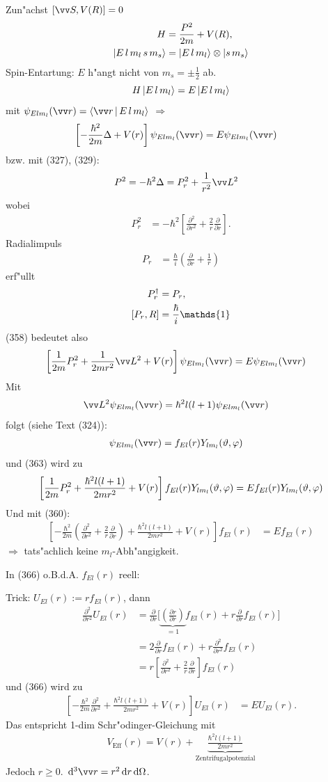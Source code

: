 \documentclass[a4paper]{scrartcl}
\newcommand{\dOne}{\ensuremath \mathds{1}}
\newcommand{\dd}{\ensuremath \, \mathrm{d}}
\renewcommand{\phi}{\ensuremath \varphi}
\newcommand{\eqn}[1]{\begin{align} #1 \end{align}}
\newcommand{\eqnnon}[1]{\begin{align*} #1 \end{align*}}
\newcommand{\spl}[1]{\begin{split} #1 \end{split}}
\begin{document}
{Zun"achst $[\vv S, V(R)] = 0$
\eqn{ \spl{ H & = \frac{P^2}{2m} + V(R), \\ \Ket{ E \, l \, m_l \, s \, m_s } & = \Ket{ E \, l \, m_l } \otimes \Ket{ s \, m_s}}}
Spin-Entartung: $E$ h"angt nicht von $m_s = \pm \frac12$ ab.
$$H \Ket{E \, l \, m_l } = E \Ket{ E \, l \, m_l }$$
mit $\psi_{E l m_l}(\vv r) = \Braket{ \vv r | E \, l \, m_l }$
$\Longrightarrow$
\eqn{ \left[ - \frac{\hbar^2}{2m} \Delta + V(r) \right] \psi_{E l m_l}(\vv r) & = E \psi_{E l m_l}(\vv r)}
bzw. mit (327), (329):
\eqn{ P^2 = - \hbar^2 \Delta & = P_r^2 + \frac1{r^2} \vv L^2}
wobei
\eqn{P_r^2 & = -\hbar^2 \left[ \frac {\partial^2}{\partial r^2} + \frac2r \frac \partial {\partial r} \right]. }
Radialimpuls
\eqn{ P_r & = \frac \hbar i \left( \frac \partial {\partial r} + \frac1r \right) }
erf"ullt
\eqn{ \spl{ P_r^\dagger & = P_r, \\ \left[ P_r, R \right] & = \frac \hbar i \dOne }}
(358) bedeutet also
\eqn{ \left[ \frac1{2m} P_r^2 + \frac1{2mr^2} \vv L^2 + V(r) \right] \psi_{E l m_l }(\vv r) & = E \psi_{E l m_l }(\vv r)}
Mit 
\eqn{ \vv L^2 \psi_{E l m_l} (\vv r) & = \hbar^2 l (l+1) \psi_{E l m_l}(\vv r)}
folgt (siehe Text (324)):
\eqn{\psi_{E l m_l}(\vv r) & = f_{E l}(r) Y_{l m_l}( \vartheta, \phi) }
und (363) wird zu 
$$\left[ \frac 1{2m} P_r^2 + \frac{\hbar^2 l (l+1)}{2 m r^2} + V(r) \right] f_{E l} (r) Y_{l m_l} ( \vartheta, \phi)  = E f_{El}(r) Y_{l m_l}(\vartheta, \phi)$$
Und mit (360):
\eqn{\left[ - \frac{\hbar^2}{2m} \left( \frac{\partial^2}{\partial r^2} + \frac 2 r \frac \partial {\partial r} \right) + \frac{ \hbar^2 l (l+1) }{2 m r^2} + V(r) \right] f_{E l}(r) & = E f_{E l}(r)}
$\Longrightarrow$ tats"achlich keine $m_l$-Abh"angigkeit.

In (366) o.B.d.A. $f_{E l }(r)$ reell:

Trick: $U_{E l}(r) := r f_{E l}(r)$, dann
\eqnnon{
\frac{\partial^2}{\partial r^2} U_{E l}(r) & = \frac{ \partial}{\partial r} \Big[ \underbrace{ \left( \frac{\partial r}{\partial r} \right)}_{=1} f_{E l}(r) + r \frac{\partial}{\partial r} f_{E l}(r) \Big] \\
& = 2 \frac{\partial}{\partial r} f_{E l}(r) + r\frac{\partial^2}{\partial r^2} f_{E l}(r) \\
& = r \left[ \frac{\partial^2}{\partial r^2} + \frac2r \frac \partial {\partial r} \right] f_{E l}(r)
}
und (366) wird zu 
\eqn{ \left[ - \frac{\hbar^2}{2m} \frac{\partial^2}{\partial r^2} + \frac{\hbar^2 l(l+1)}{2m r^2} + V(r) \right] U_{E l} (r) & = E U_{E l}(r).}
Das entspricht 1-dim Schr"odinger-Gleichung mit
\eqn{ V_{\mathrm{Eff}}(r) = V(r) + \underbrace{ \frac{\hbar^2 l(l+1) }{2m r^2}}_{\mathrm{Zentrifugalpotenzial}}}
Jedoch $r \geq 0$. $\dd^3 \vv r = r^2 \dd r \dd \Omega$.

}
\end{document}
